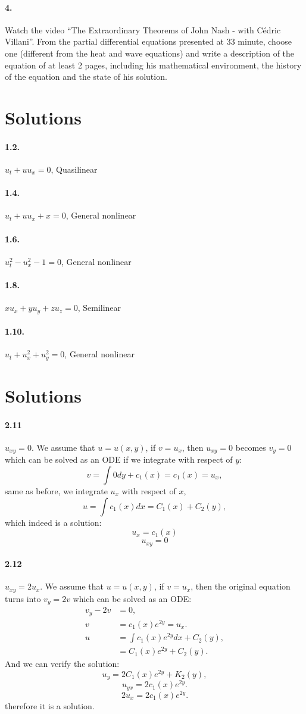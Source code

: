 \documentclass{article}
\begin{document}
\paragraph{4.} Watch the video “The Extraordinary Theorems of John Nash - with Cédric Villani”. From the partial differential equations presented at 33 minute, choose one (different from the heat and wave equations) and write a description of the equation of at least 2 pages, including his mathematical environment, the history of the equation and the state of his solution.
\newpage
\section{Solutions}
\paragraph{1.2.} $u_t+uu_x= 0$, Quasilinear
\paragraph{1.4.} $u_t+u u_x+x=0$, General nonlinear
\paragraph{1.6.} $u_t^2-u_x^2-1=0$, General nonlinear
\paragraph{1.8.} $x u_x + y u_y+ zu_z=0$, Semilinear
\paragraph{1.10.} $u_t + u_x^2+u_y^2=0$, General nonlinear
\section{Solutions}
\paragraph{2.11} $u_{xy}=0$. We assume that $u = u(x,y)$, if $v = u_x$, then $u_{xy} = 0$ becomes $v_y = 0$ which can be solved as an ODE if we integrate with respect of $y$:
$$v = \int 0 dy  + c_1(x)= c_1(x) = u_x,$$
same as before, we integrate $u_x$ with respect of $x$,
$$u = \int c_1(x) dx = C_1(x) + C_2(y),$$
which indeed is a solution:
$$u_x = c_1(x)$$
$$u_{xy} = 0$$
\paragraph{2.12} $u_{xy}= 2u_x$. We assume that $u = u(x,y)$, if $v = u_x$, then the original equation turns into $v_y = 2v$ which can be solved as an ODE:
\begin{align*}
v_y - 2v &= 0,\\
v &= c_1(x)e^{2y} = u_x. \\[12pt]
u &= \int c_1(x)e^{2y} dx + C_2(y),\\
 &= C_1(x)e^{2y} + C_2(y).	
\end{align*}
And we can verify the solution:
$$u_y = 2C_1(x)e^{2y} + K_2(y),$$
$$u_{yx} = 2c_1(x)e^{2y}.$$
$$2u_x = 2c_1(x)e^{2y}.$$
therefore it is a solution.
\end{document}
